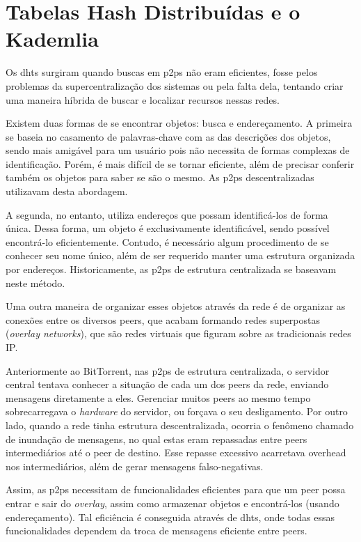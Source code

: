 
\newpage
\section{Tabelas Hash Distribuídas e o Kademlia}

Os \glspl{dht} surgiram quando buscas em \glspl{p2p} não eram eficientes, fosse pelos
problemas da supercentralização dos sistemas ou pela falta dela, tentando criar uma
maneira híbrida de buscar e localizar recursos nessas redes.

Existem duas formas de se encontrar objetos: busca e endereçamento. A primeira se baseia
no casamento de palavras-chave com as das descrições dos objetos, sendo mais amigável
para um usuário pois não necessita de formas complexas de identificação. Porém, é mais
difícil de se tornar eficiente, além de precisar conferir também os objetos para saber
se são o mesmo. As \glspl*{p2p} descentralizadas utilizavam desta abordagem.

A segunda, no entanto, utiliza endereços que possam identificá-los de forma única. Dessa
forma, um objeto é exclusivamente identificável, sendo possível encontrá-lo
eficientemente. Contudo, é necessário algum procedimento de se conhecer seu nome único,
além de ser requerido manter uma estrutura organizada por endereços. Historicamente, as
\glspl*{p2p} de estrutura centralizada se baseavam neste método.

Uma outra maneira de organizar esses objetos através da rede é de organizar as conexões
entre os diversos \glspl*{peer}, que acabam formando redes superpostas (\emph{overlay
networks}), que são redes virtuais que figuram sobre as tradicionais redes IP.

Anteriormente ao BitTorrent, nas \glspl*{p2p} de estrutura centralizada, o servidor
central tentava conhecer a situação de cada um dos \glspl*{peer} da rede, enviando
mensagens diretamente a eles. Gerenciar muitos \glspl*{peer} ao mesmo tempo
sobrecarregava o \emph{hardware} do servidor, ou forçava o seu desligamento. Por outro
lado, quando a rede tinha estrutura descentralizada, ocorria o fenômeno chamado de
inundação de mensagens, no qual estas eram repassadas entre \glspl*{peer}
intermediários até o \gls*{peer} de destino. Esse repasse excessivo acarretava
\gls{overhead} nos intermediários, além de gerar mensagens falso-negativas.

Assim, as \glspl*{p2p} necessitam de funcionalidades eficientes para que um \gls*{peer}
possa entrar e sair do \emph{overlay}, assim como armazenar objetos e encontrá-los
(usando endereçamento). Tal eficiência é conseguida através de \glspl{dht}, onde todas
essas funcionalidades dependem da troca de mensagens eficiente entre \glspl*{peer}.

